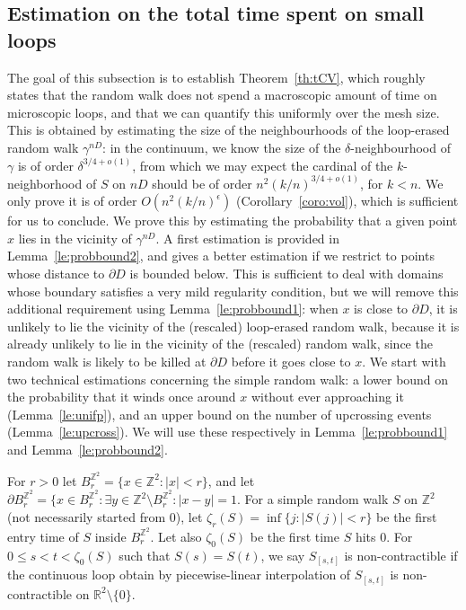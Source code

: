 \documentclass[11pt]{article}
\begin{document}
\subsection{Estimation on the total time spent on small loops}

\label{SS:timesmallloops}

The goal of this subsection is to establish Theorem~\ref{th:tCV}, which roughly states that the random walk does not spend a macroscopic amount of time on microscopic loops, and that we can quantify this uniformly over the mesh size. This is obtained by estimating the size of the neighbourhoods of the loop-erased random walk $\gamma^{nD}$: in the continuum, we know the size of the $\delta$-neighbourhood of $\gamma$ is of order $\delta^{3/4+o(1)}$, from which we may expect the cardinal of the $k$-neighborhood of $S$ on $nD$ should be of order $n^2(k/n)^{3/4+o(1)}$, for $k<n$. We only prove it is of order $O(n^2(k/n)^{\epsilon})$ (Corollary~\ref{coro:vol}), which is sufficient for us to conclude. We prove this by estimating the probability that a given point $x$ lies in the vicinity of $\gamma^{nD}$. A first estimation is provided in Lemma~\ref{le:probbound2}, and gives a better estimation if we restrict to points whose distance to $\partial D$ is bounded below. This is sufficient to deal with domains whose boundary satisfies a very mild regularity condition, but we will remove this additional requirement using Lemma~\ref{le:probbound1}: when $x$ is close to $\partial D$, it is unlikely to lie
the vicinity of the (rescaled) loop-erased random walk, because it is already unlikely to lie in the vicinity of the (rescaled) random walk, since the random walk is likely to be killed at $\partial D$ before it goes close to $x$. We start with two technical estimations concerning the simple random walk: a lower bound on the probability that it winds once around $x$ without ever approaching it (Lemma~\ref{le:unifp}), and an upper bound on the number of upcrossing events (Lemma~\ref{le:upcross}). We will use these respectively in
Lemma~\ref{le:probbound1} and Lemma~\ref{le:probbound2}.

\medskip

For $r>0$ let $B_r^{\mathbb{Z}^2}=\{ x\in \mathbb{Z}^2: |x|< r \} $, and let $\partial B^{\mathbb{Z}^2}_r=\{x\in B^{\mathbb{Z}^2}_r: \exists y \in  \mathbb{Z}^2 \setminus B^{\mathbb{Z}^2}_r: |x-y|=1$.
For a simple random walk $S$ on $\mathbb{Z}^2$ (not necessarily started from $0$), let $\zeta_r(S)=\inf\{j: |S(j)|< r \}$ be the first entry time of $S$ inside $B^{\mathbb{Z}^2}_r$.  Let also $\zeta_0(S)$ be the first time $S$ hits $0$.
For $0\leq s<t<\zeta_0(S)$ such that $S(s)=S(t)$, we say $S_{[s,t]}$ is non-contractible if the continuous loop obtain by piecewise-linear interpolation of $S_{[s,t]}$ is non-contractible on $\mathbb{R}^2\setminus \{0\}$.
\end{document}
